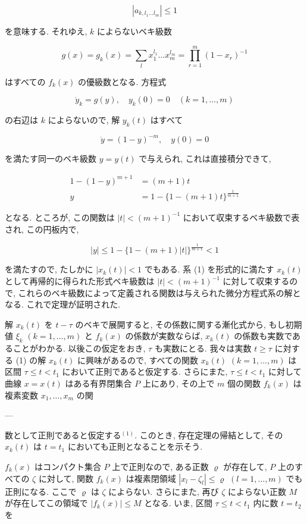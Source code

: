 \documentclass[dvipdfmx, leqno]{jsbook}
\begin{document}
$$|a_{k, l_1 \dots l_m}| \leq 1$$

を意味する. それゆえ, $k$ によらないベキ級数

$$g(x) = g_k(x) = \sum_{l} x_1^{l_1} \dots x_m^{l_m} = \prod_{r=1}^{m} (1 - x_r)^{-1}$$

はすべての $f_k(x)$ の優級数となる. 方程式

$$\dot{y}_k = g(y), \quad y_k(0) = 0 \quad (k=1,\dots,m)$$

の右辺は $k$ によらないので, 解 $y_k(t)$ はすべて

$$\dot{y} = (1 - y)^{-m}, \quad y(0) = 0$$

を満たす同一のベキ級数 $y = y(t)$ で与えられ, これは直接積分できて,

$$\begin{aligned} 1 - (1 - y)^{m+1} &= (m+1)t \\ y &= 1 - \{1 - (m+1)t\}^{\frac{1}{m+1}} \end{aligned}$$

となる. ところが, この関数は $|t| < (m+1)^{-1}$ において収束するベキ級数で表され, この円板内で,

$$|y| \leq 1 - \{1 - (m+1)|t|\}^{\frac{1}{m+1}} < 1$$

を満たすので, たしかに $|x_k(t)| < 1$ でもある. 系 (1) を形式的に満たす $x_k(t)$ として再帰的に得られた形式ベキ級数は $|t| < (m+1)^{-1}$ に対して収束するので, これらのベキ級数によって定義される関数は与えられた微分方程式系の解となる. これで定理が証明された.

解 $x_k(t)$ を $t - \tau$ のベキで展開すると, その係数に関する漸化式から, もし初期値 $\xi_k$ $(k=1,\dots,m)$ と $f_k(x)$ の係数が実数ならば, $x_k(t)$ の係数も実数であることがわかる. 以後この仮定をおき, $\tau$ も実数にとる. 我々は実数 $t \geq \tau$ に対する (1) の解 $x_k(t)$ に興味があるので, すべての関数 $x_k(t)$ $(k=1,\dots,m)$ は区間 $\tau \leq t < t_1$ において正則であると仮定する. さらにまた, $\tau \leq t < t_1$ に対して曲線 $x = x(t)$ はある有界閉集合 $P$ 上にあり, その上で $m$ 個の関数 $f_k(x)$ は複素変数 $x_1, \dots, x_m$ の関

---

数として正則であると仮定する$^{(1)}$. このとき, 存在定理の帰結として, その $x_k(t)$ は $t = t_1$ においても正則となることを示そう.

$f_k(x)$ はコンパクト集合 $P$ 上で正則なので, ある正数 $\varrho$ が存在して, $P$ 上のすべての $\zeta$ に対して, 関数 $f_k(x)$ は複素閉領域 $|x_l - \zeta_l| \leq \varrho$ $(l=1,\dots,m)$ でも正則になる. ここで $\varrho$ は $\zeta$ によらない. さらにまた, 再び $\zeta$ によらない正数 $M$ が存在してこの領域で $|f_k(x)| \leq M$ となる. いま, 区間 $\tau \leq t < t_1$ 内に数 $t = t_2$ を
\end{document}
